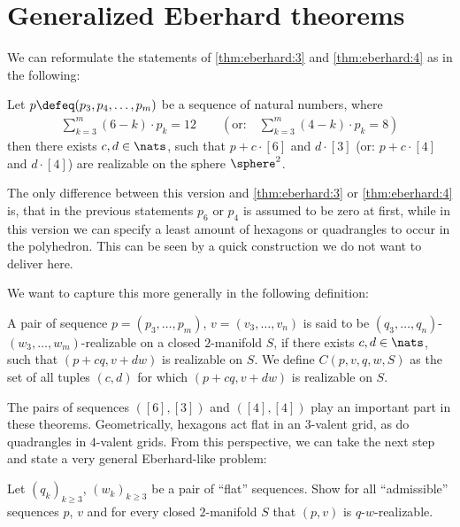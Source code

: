 \section{Generalized {\sc Eberhard} theorems}\label{sec:gen:eberhard}
We can reformulate the statements of \autoref{thm:eberhard:3} and \autoref{thm:eberhard:4} as in the following:
\begin{theorem}
  Let $p \defeq (p_3, p_4, \dots, p_m)$ be a sequence of natural numbers, where
  \begin{align*}
    \sum_{k=3}^m(6 - k) \cdot p_k = 12 \qquad \left( \text{or:}\quad \sum_{k=3}^m(4 - k) \cdot p_k = 8 \right)
  \end{align*}
  then there exists $c, d \in \nats$, such that $p + c \cdot [6]$ and $d \cdot [3]$ (or: $p + c \cdot [4]$ and $d \cdot [4]$) are realizable on the sphere $\sphere^2$.
\end{theorem}

\begin{remark}
The only difference between this version and \autoref{thm:eberhard:3} or \autoref{thm:eberhard:4} is, that in the previous statements $p_6$ or $p_4$ is assumed to be zero at first, while in this version we can specify a least amount of hexagons or quadrangles to occur in the polyhedron. This can be seen by a quick construction we do not want to deliver here. 
\end{remark}

We want to capture this more generally in the following definition:
\begin{definition}\label{def:eberhard:realizable}
  A pair of sequence $p = (p_3, \dots, p_m)$, $v = (v_3, \dots, v_n)$ is said to be $(q_3, \dots, q_n)$-$(w_3, \dots, w_m)$-realizable on a closed $2$-manifold $S$, if there exists $c, d \in \nats$, such that $(p + c q, v + d w)$ is realizable on $S$. We define $C(p, v, q, w, S)$ as the set of all tuples $(c, d)$ for which $(p + c q, v + d w)$ is realizable on $S$.
\end{definition}

The pairs of sequences $([6], [3])$ and $([4], [4])$ play an important part in these theorems. Geometrically, hexagons act flat in an $3$-valent grid, as do quadrangles in $4$-valent grids. From this perspective, we can take the next step and state a very general {\sc Eberhard}-like problem:

\begin{problem}\label{prob:eberhard:unspecified}
  Let $(q_k)_{k \geq 3}$, $(w_k)_{k \geq 3}$ be a pair of ``flat'' sequences. Show for all ``admissible'' sequences $p$, $v$ and for every closed $2$-manifold $S$ that $(p, v)$ is $q$-$w$-realizable.
\end{problem}


